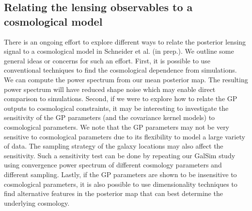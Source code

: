 \subsection{Relating the lensing observables to a cosmological model}
There is an ongoing effort to explore different ways to relate the posterior lensing signal 
to a cosmological model in Schneider et al. (in prep.). We outline some general
ideas or concerns for such an effort. First, it is possible to use conventional techniques 
 to find the cosmological dependence from simulations.  
We can compute the power spectrum from our mean posterior map. The resulting
power spectrum will have reduced shape noise which may enable direct comparison to
simulations. 
Second, if we were to explore how to relate the GP outputs to cosmological constraints,  
it may be interesting to investigate the sensitivity of the GP parameters (and
the covariance kernel models) to cosmological parameters. 
We note that the GP parameters may not be very sensitive to cosmological parameters
due to its flexibility to model a large variety of data. The sampling strategy of
the galaxy locations may also affect the sensitivity. Such a sensitivity test can be
done by repeating our {\sc GalSim} study using convergence power spectrum of different cosmology 
parameters and different sampling. Lastly, if the GP parameters are shown to be
insensitive to cosmological parameters, it is also possible to use dimensionality
techniques to find alternative features in the posterior map that can best determine the
underlying cosmology. 


